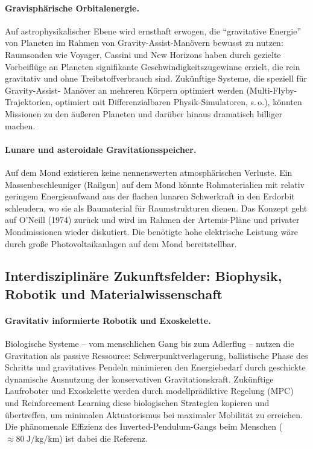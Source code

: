 ﻿\documentclass[12pt, a4paper]{report}
\theoremstyle{definition}
\theoremstyle{remark}
\begin{document}
\paragraph{Gravisphärische Orbitalenergie.}
Auf astrophysikalischer Ebene wird ernsthaft erwogen, die ``gravitative Energie''
von Planeten im Rahmen von Gravity-Assist-Manövern bewusst zu nutzen: Raumsonden
wie Voyager, Cassini und New Horizons haben durch gezielte Vorbeiflüge an Planeten
signifikante Geschwindigkeitszugewinne erzielt, die rein gravitativ und ohne
Treibstoffverbrauch sind. Zukünftige Systeme, die speziell für Gravity-Assist-
Manöver an mehreren Körpern optimiert werden (Multi-Flyby-Trajektorien, optimiert
mit Differenzialbaren Physik-Simulatoren, s.\,o.), könnten Missionen zu den
äußeren Planeten und darüber hinaus dramatisch billiger machen.

\paragraph{Lunare und asteroidale Gravitationsspeicher.}
Auf dem Mond existieren keine nennenswerten atmosphärischen Verluste. Ein
Massenbeschleuniger (Railgun) auf dem Mond könnte Rohmaterialien mit relativ
geringem Energieaufwand aus der flachen lunaren Schwerkraft in den Erdorbit
schleudern, wo sie als Baumaterial für Raumstrukturen dienen. Das Konzept geht
auf O'Neill (1974) zurück und wird im Rahmen der Artemis-Pläne und privater
Mondmissionen wieder diskutiert. Die benötigte hohe elektrische Leistung wäre
durch große Photovoltaikanlagen auf dem Mond bereitstellbar.

\subsection{Interdisziplinäre Zukunftsfelder: Biophysik, Robotik und
               Materialwissenschaft}

\paragraph{Gravitativ informierte Robotik und Exoskelette.}
Biologische Systeme -- vom menschlichen Gang bis zum Adlerflug -- nutzen die
Gravitation als passive Ressource: Schwerpunktverlagerung, ballistische Phase
des Schritts und gravitatives Pendeln minimieren den Energiebedarf durch
geschickte dynamische Ausnutzung der konservativen Gravitationskraft. Zukünftige
Laufroboter und Exoskelette werden durch modellprädiktive Regelung (MPC) und
Reinforcement Learning diese biologischen Strategien kopieren und übertreffen,
um minimalen Aktuatorismus bei maximaler Mobilität zu erreichen. Die phänomenale
Effizienz des Inverted-Pendulum-Gangs beim Menschen ($\approx \SI{80}{\joule\per\kilogram\per\kilo\metre}$)
ist dabei die Referenz.
\end{document}
